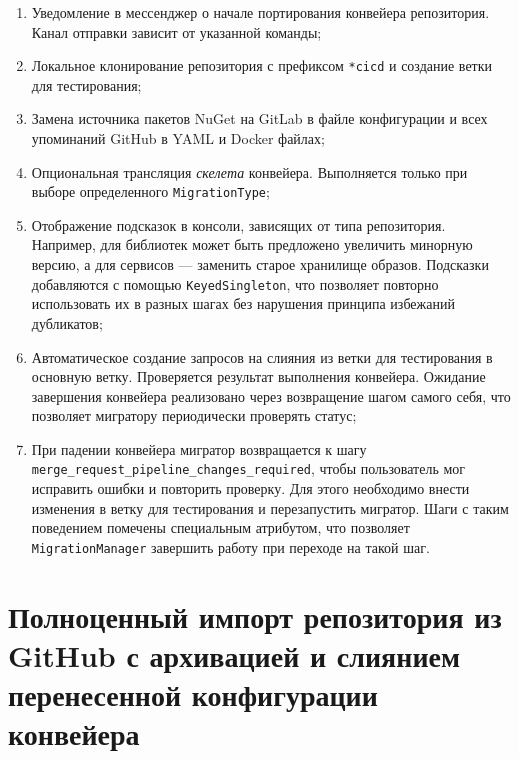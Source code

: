 \begin{enumerate}
  \item Уведомление в мессенджер о начале портирования конвейера репозитория.
        Канал отправки зависит от указанной команды;
  \item Локальное клонирование репозитория с префиксом \texttt{*cicd} и создание ветки для тестирования;
  \item Замена источника пакетов NuGet\cite{nuget} на GitLab в файле конфигурации и всех упоминаний GitHub в YAML и Docker файлах;
  \item Опциональная трансляция \emph{скелета} конвейера.
        Выполняется только при выборе определенного \texttt{MigrationType};
  \item Отображение подсказок в консоли, зависящих от типа репозитория.
        Например, для библиотек может быть предложено увеличить минорную версию, а для сервисов — заменить старое хранилище образов.
        Подсказки добавляются с помощью \texttt{KeyedSingleton}, что позволяет повторно использовать их в разных шагах без нарушения принципа избежаний дубликатов;
  \item Автоматическое создание запросов на слияния из ветки для тестирования в основную ветку.
        Проверяется результат выполнения конвейера.
        Ожидание завершения конвейера реализовано через возвращение шагом самого себя, что позволяет мигратору периодически проверять статус;
  \item При падении конвейера мигратор возвращается к шагу \texttt{merge\_request\_pipeline\_changes\_required}, чтобы пользователь мог исправить ошибки и повторить проверку.
        Для этого необходимо внести изменения в ветку для тестирования и перезапустить мигратор.
        Шаги с таким поведением помечены специальным атрибутом, что позволяет \texttt{MigrationManager} завершить работу при переходе на такой шаг.
\end{enumerate}

\section{Полноценный импорт репозитория из GitHub с архивацией и слиянием перенесенной конфигурации конвейера} \label{sec:third-phase}

